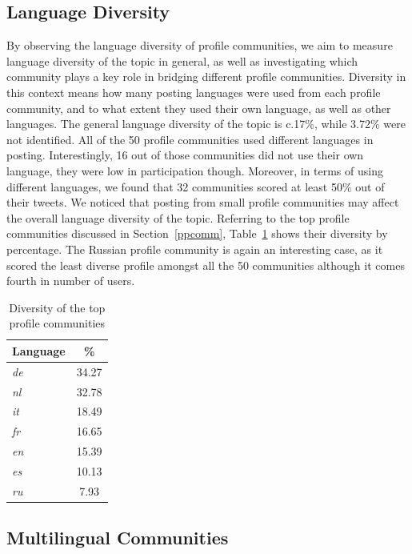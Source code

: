 \documentclass[conference]{IEEEtran}
\begin{document}
\subsection{Language Diversity}

By observing the language diversity of profile communities, we aim to
measure language diversity of the topic in general, as well as
investigating which community plays a key role in bridging different
profile communities. Diversity in this context means how many posting
languages were used from each profile community, and to what extent
they used their own language, as well as other languages.  The general
language diversity of the topic is c.17\%, while 3.72\% were not
identified. All of the 50 profile communities used different languages
in posting. Interestingly, 16 out of those communities did not use
their own language, they were low in participation though. Moreover,
in terms of using different languages, we found that 32 communities
scored at least 50\% out of their tweets. We noticed that posting from
small profile communities may affect the overall language diversity of
the topic. Referring to the top profile communities discussed in
Section~\ref{ppcomm}, Table~\ref{tbl:diversity} shows their
diversity by percentage. The Russian profile community is again an
interesting case, as it scored the least diverse profile amongst all
the 50 communities although it comes fourth in number of users.


\begin{table}[!htb]
\centering
\begin{tabular}{@{}lc}
\toprule
\textbf{Language} & \textbf{\%} \\ 
\midrule
{\emph{de}} & 34.27 \\
{\emph{nl}} & 32.78 \\
{\emph{it}} & 18.49 \\ 
{\emph{fr}} & 16.65 \\
{\emph{en}} & 15.39 \\
{\emph{es}} & 10.13 \\
{\emph{ru}} & 7.93 \\
\bottomrule
\end{tabular}
\caption{Diversity of the top profile communities}
\label{tbl:diversity}
\end{table}


\subsection{Multilingual Communities}
\end{document}
